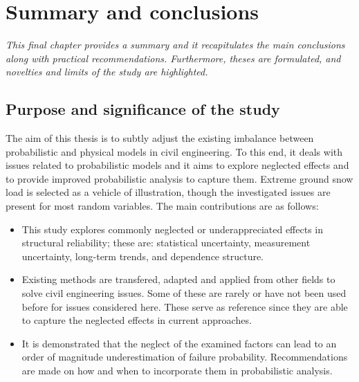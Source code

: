 \chapter{Summary and conclusions}
\label{cha:summary}
\ifpdf
    \graphicspath{{Chapter9/Figs/Raster/}{Chapter9/Figs/PDF/}{Chapter9/Figs/}}
\else
    \graphicspath{{Chapter9/Figs/Vector/}{Chapter9/Figs/}}
\fi

\leftskip=1cm
\noindent
\emph{This final chapter provides a summary and it recapitulates the main conclusions along with practical recommendations. Furthermore, theses are formulated, and novelties and limits of the study are highlighted.}

\leftskip=0pt\rightskip=0pt

\section{Purpose and significance of the study}

The aim of this thesis is to subtly adjust the existing imbalance between probabilistic and physical models in civil engineering. To this end, it deals with issues related to probabilistic models and it aims to explore neglected effects and to provide improved probabilistic analysis to capture them.  Extreme ground snow load is selected as a vehicle of illustration, though the investigated issues are present for most random variables. The main contributions are as follows:
\begin{itemize}
	\item This study explores commonly neglected or underappreciated effects in structural reliability; these are: statistical uncertainty, measurement uncertainty, long-term trends, and dependence structure.
	\item Existing methods are transfered, adapted and applied from other fields to solve civil engineering issues. Some of these are rarely or have not been used before for issues considered here. These serve as reference since they are able to capture the neglected effects in current approaches.
	\item It is demonstrated that the neglect of the examined factors can lead to an order of magnitude underestimation of failure probability. Recommendations are made on how and when to incorporate them in probabilistic analysis.
\end{itemize}

